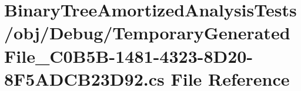 \hypertarget{_binary_tree_amortized_analysis_tests_2obj_2_debug_2_temporary_generated_file__036_c0_b5_b-1481-1da7262d0322d7d145c11375563a6b1f}{}\section{Binary\+Tree\+Amortized\+Analysis\+Tests/obj/\+Debug/\+Temporary\+Generated\+File\+\_\+C0\+B5\+B-\/1481-\/4323-\/8\+D20-\/8\+F5\+A\+D\+C\+B23\+D92.cs File Reference}
\label{_binary_tree_amortized_analysis_tests_2obj_2_debug_2_temporary_generated_file__036_c0_b5_b-1481-1da7262d0322d7d145c11375563a6b1f}
